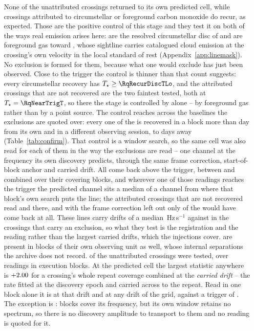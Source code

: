 None of the unattributed crossings returned to its own predicted cell, while
\MkAttrRecur{} crossings attributed to circumstellar or foreground carbon
monoxide do recur, as expected. Those \MkAttrRecur{} are the positive control of this stage and they
test it on both of the ways real emission arises here: \RqNRecurDisc{} are the
resolved circumstellar disc of \RqRecurDiscStars{} and \RqNRecurCloud{} are
foreground gas toward \RqRecurCloudStars, whose sightline carries catalogued
cloud emission at the crossing's own velocity in the local standard of rest
(Appendix~\ref{app:linemask}). No exclusion is formed for them, because what
one would exclude has just been observed. Close to the trigger the control is
thinner than that count suggests: every circumstellar recovery has
$T_\star\ge\RqRecurDiscTLo$, and the \RqNearTrigN{} attributed crossings that
are not recovered are the two faintest tested, both at
$T_\star=\RqNearTrigT$, so there the stage is controlled by
\RqRecurCloudStars{} alone -- by foreground gas rather than by a point
source. The control reaches across the baselines the exclusions are quoted
over: every one of the \QcNCtl{} is recovered in a block more than \EpSep{}
day from its own and in a different observing session, \QcSepMinD{} to
\QcSepMaxD{} days away (Table~\ref{tab:confirm}).
That control is a window search, so the same cell was also read for each of
them in the way the exclusions are read -- one channel at the frequency its
own discovery predicts, through the same frame correction, start-of-block
anchor and carried drift. All \LrNCtl{} come back above the trigger, between
\LrTrepLo{} and \LrTrepHi{} combined over their covering blocks, and
wherever one of those readings reaches the trigger the predicted channel sits
a median \LrDchMed{} of a channel from where that block's own search puts the
line; the \LrNAbs{} attributed crossings that are not recovered read
\LrAbsHi{} and \LrAbsLo{} there, and with the frame correction left out only
\LrNoFrameCtl{} of the \LrNCtl{} would have come back at all. These lines
carry drifts of a median \LrDriftMedLine\,Hz\,s$^{-1}$ against
\LrDriftMedExcl{} in the crossings that carry an exclusion, so what they test
is the registration and the reading rather than the largest carried drifts,
which the injections cover. \QcNUnrecWord{} are present
in blocks of their own observing unit as well, whose internal separations the
archive does not record. \RcNExclPoss{} of the \RcNTested{} unattributed crossings were tested,
over \RcNRepeatMeas{} readings in \RcNRepeatBlock{} execution blocks. At the
predicted cell the largest statistic anywhere is $+2.00$ for a crossing's
whole repeat coverage combined at the \emph{carried drift} -- the rate fitted
at the discovery epoch and carried across to the repeat. Read in one block
alone it is \RcTMatched{} at that drift and \RcTMax{} at any drift of the
grid, against a trigger of \StageNullTrig. The exception is \RcUntStar{} \texttt{\RcUntEb}:
\RcUntNRep{} blocks cover its frequency, but its own window retains no
spectrum, so there is no discovery amplitude to transport to them and no
reading is quoted for it.

